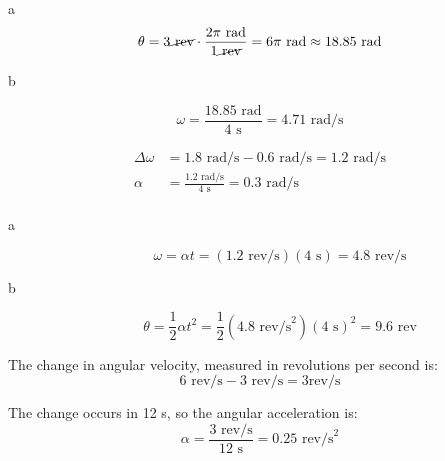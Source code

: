 \documentclass{exam}
\begin{document}
\begin{description}
\begin{description*}
\item[a]
\[
  \theta = 3 \cancel{\text{ rev}} \cdot \frac{2 \pi \text{ rad}}{1 \cancel{\text{ rev}}} = 6 \pi \text{ rad} 
  \approx 18.85 \text{ rad}
\]

\item[b]

\[
  \omega = \frac{18.85 \text{ rad}}{4 \text{ s}} = 4.71 \text{ rad/s}
\]
 
\end{description*}

\item[E4]
\begin{align*}
  \Delta \omega &= 1.8 \text{ rad/s} - 0.6 \text{ rad/s} = 1.2 \text{ rad/s} \\
  \alpha &= \frac{1.2 \text{ rad/s}}{4 \text{ s}} = 0.3 \text{ rad/s} \\
\end{align*}

\item[E5]
\begin{description}
\item[a]
\[
  \omega = \alpha t = (1.2 \text{ rev/s})(4 \text{ s}) = 4.8 \text{ rev/s}
\]


\item[b]
\[
  \theta = \frac{1}{2} \alpha t^2 = \frac{1}{2} (4.8 \text{ rev/s}^2) (4 \text{ s})^2 = 9.6 \text{ rev}
\]


\end{description}

\item[E6]
The change in angular velocity, measured in revolutions per second is: 
\[
  6 \text{ rev/s} - 3 \text{ rev/s} = 3 \text{rev/s}
\]


The change occurs in 12 s, so the angular acceleration is:
\[
  \alpha = \frac{3 \text{ rev/s}}{12 \text{ s}} = 0.25 \text{ rev/s}^2
\]


\end{description}
\end{document}
